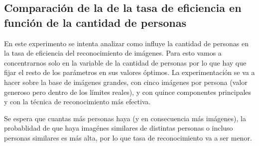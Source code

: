 \subsection{Comparación de la de la tasa de eficiencia en función de la cantidad de personas}
En este experimento se intenta analizar como influye la cantidad de personas en la tasa de eficiencia del reconocimiento de imágenes. Para esto vamos a concentrarnos solo en la variable de la cantidad de personas por lo que hay que fijar el resto de los parámetros en sus valores óptimos. La experimentación se va a hacer sobre la base de imágenes grandes, con cinco imágenes por persona (valor generoso pero dentro de los límites reales), y con quince componentes principales y con la técnica de reconocimiento más efectiva.

Se espera que cuantas más personas haya (y en consecuencia más imágenes), la probablidad de que haya imagénes similares de distintas personas o incluso personas similares es más alta, por lo que tasa de reconocimiento va a ser menor.
